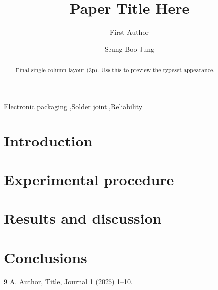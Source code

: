 \documentclass[final,3p,times]{elsarticle}
\begin{document}
\begin{frontmatter}

\title{Paper Title Here}

\author[skku]{First Author}
\author[skku]{Seung-Boo Jung}

\begin{abstract}
Final single-column layout (3p). Use this to preview the typeset appearance.
\end{abstract}

\begin{keyword}
Electronic packaging \sep Solder joint \sep Reliability
\end{keyword}

\end{frontmatter}

\section{Introduction}

\section{Experimental procedure}

\section{Results and discussion}

\section{Conclusions}

\begin{thebibliography}{9}
 A. Author, Title, Journal 1 (2026) 1--10.
\end{thebibliography}
\end{document}
